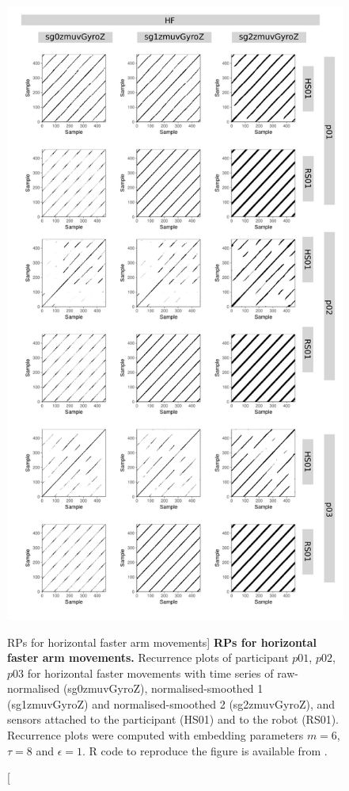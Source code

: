 \begin{figure}
\centering
\includegraphics[height=0.80\textheight]{rp_HF}
\caption
	[RPs for horizontal faster arm movements]{
	{\bf RPs for horizontal faster arm movements.}	
	Recurrence plots %
	of participant $p01$, $p02$, $p03$ for horizontal faster
	movements with time series of raw-normalised (sg0zmuvGyroZ), 
	normalised-smoothed 1 (sg1zmuvGyroZ) and 
	normalised-smoothed 2 (sg2zmuvGyroZ), and 
	sensors attached to the participant (HS01) and to the robot (RS01).
	Recurrence plots were computed with 
	embedding parameters $m=6$, $\tau=8$ and $\epsilon=1$.
	R code to reproduce the figure is available from \cite{hwum2018}.
        }
    \label{fig:rp_HF}
\end{figure}







